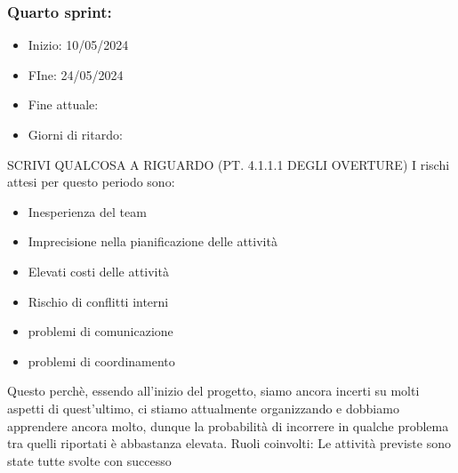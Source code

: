     \subsubsection{Quarto sprint:}
    \begin{itemize}
        \item Inizio: 10/05/2024
        \item FIne: 24/05/2024
        \item Fine attuale:
        \item Giorni di ritardo:
    \end{itemize}
    SCRIVI QUALCOSA A RIGUARDO (PT. 4.1.1.1 DEGLI OVERTURE)
    I rischi attesi per questo periodo sono:
    \begin{itemize}
        \item Inesperienza del team
        \item Imprecisione nella pianificazione delle attività
        \item Elevati costi delle attività
        \item Rischio di conflitti interni 
        \item problemi di comunicazione
        \item problemi di coordinamento
    \end{itemize}
    Questo perchè, essendo all’inizio del progetto, siamo ancora incerti su molti aspetti di quest’ultimo, ci stiamo attualmente organizzando e dobbiamo apprendere ancora molto, dunque la probabilità di incorrere in qualche problema tra quelli riportati è abbastanza elevata.
    Ruoli coinvolti: 
    Le attività previste sono state tutte svolte con successo

